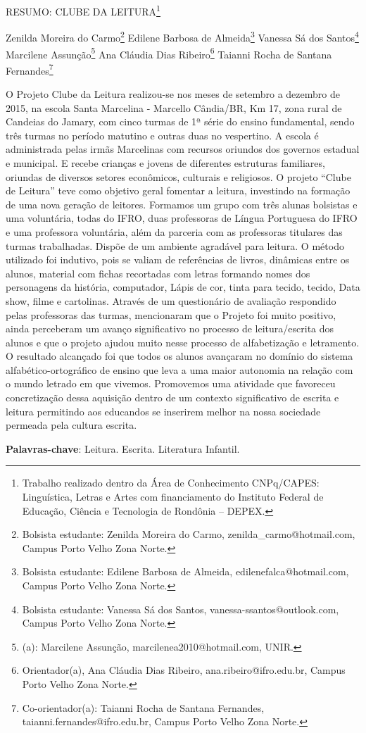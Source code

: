 \documentclass[article,12pt,onesidea,4paper,english,brazil]{abntex2}
\begin{document}
	
	
	\frenchspacing 
	
	\begin{center}
		\LARGE RESUMO: CLUBE DA LEITURA\footnote{Trabalho realizado dentro da Área de Conhecimento CNPq/CAPES: Linguística, Letras e Artes com financiamento do Instituto Federal de Educação, Ciência e Tecnologia de Rondônia – DEPEX.}
		
		\normalsize
		Zenilda Moreira do Carmo\footnote{Bolsista estudante: Zenilda Moreira do Carmo, zenilda\_carmo@hotmail.com, Campus Porto Velho Zona Norte. } 
		Edilene Barbosa de Almeida\footnote{Bolsista estudante: Edilene Barbosa de Almeida, edilenefalca@hotmail.com, Campus Porto Velho Zona Norte.} 
		Vanessa Sá dos Santos\footnote{Bolsista estudante: Vanessa Sá dos Santos, vanessa-ssantos@outlook.com, Campus Porto Velho Zona Norte.} 
		Marcilene Assunção\footnote{(a): Marcilene Assunção, marcilenea2010@hotmail.com, UNIR.} 
		Ana Cláudia Dias Ribeiro\footnote{Orientador(a), Ana Cláudia Dias Ribeiro, ana.ribeiro@ifro.edu.br, Campus Porto Velho Zona Norte. }
		Taianni Rocha de Santana Fernandes\footnote{Co-orientador(a): Taianni Rocha de Santana Fernandes, taianni.fernandes@ifro.edu.br, Campus Porto Velho Zona Norte.}
	\end{center}
	
	\noindent O Projeto Clube da Leitura realizou-se nos meses de setembro a dezembro de 2015, na escola Santa Marcelina - Marcello Cândia/BR, Km 17, zona rural de Candeias do Jamary, com cinco turmas de 1ª série do ensino fundamental, sendo três turmas no período matutino e outras duas no vespertino. A escola é administrada pelas irmãs Marcelinas com recursos oriundos dos governos estadual e municipal. E recebe crianças e jovens de diferentes estruturas familiares, oriundas de diversos setores econômicos, culturais e religiosos. O projeto “Clube de Leitura” teve como objetivo geral fomentar a leitura, investindo na formação de uma nova geração de leitores. Formamos um grupo com três alunas bolsistas e uma voluntária, todas do IFRO, duas professoras de Língua Portuguesa do IFRO e uma professora voluntária, além da parceria com as professoras titulares das turmas trabalhadas. Dispõe de um ambiente agradável para leitura. O método utilizado foi indutivo, pois se valiam de referências de livros, dinâmicas entre os alunos, material com fichas recortadas com letras formando nomes dos personagens da história, computador, Lápis de cor, tinta para tecido, tecido, Data show, filme e cartolinas. Através de um questionário de avaliação respondido pelas professoras das turmas, mencionaram que o Projeto foi muito positivo, ainda perceberam um avanço significativo no processo de leitura/escrita dos alunos e que o projeto ajudou muito nesse processo de alfabetização e letramento. O resultado alcançado foi que todos os alunos avançaram no domínio do sistema alfabético-ortográfico de ensino que leva a uma maior autonomia na relação com o mundo letrado em que vivemos. Promovemos uma atividade que favoreceu concretização dessa aquisição dentro de um contexto significativo de escrita e leitura permitindo aos educandos se inserirem melhor na nossa sociedade permeada pela cultura escrita.
	
	\vspace{\onelineskip}
	
	\noindent
	\textbf{Palavras-chave}: Leitura. Escrita. Literatura Infantil.
	
\end{document}
